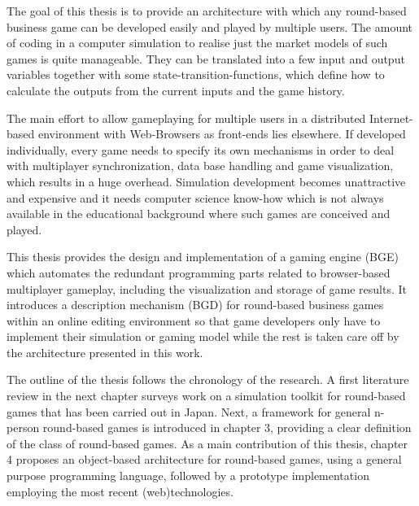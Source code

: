 The goal of this thesis is to provide an architecture with which any round-based business game can be developed easily and played by multiple users. The amount of coding in a computer simulation to realise just the market models of such games is quite manageable. They can be translated into a few input and output variables together with some state-transition-functions, which define how to calculate the outputs from the current inputs and the game history.

The main effort to allow gameplaying for multiple users in a distributed Internet-based environment with Web-Browsers as front-ends lies elsewhere. If developed individually, every game needs to specify its own mechanisms in order to deal with multiplayer synchronization, data base handling and game visualization, which results in a huge overhead. Simulation development becomes unattractive and expensive and it needs computer science know-how which is not always available in the educational background where such games are conceived and played.

This thesis provides the design and implementation of a gaming engine (BGE) which automates the redundant programming parts related to browser-based multiplayer gameplay, including the visualization and storage of game results. It introduces a description mechanism (BGD) for round-based business games within an online editing environment so that game developers only have to implement their simulation or gaming model while the rest is taken care off by the architecture presented in this work.

The outline of the thesis follows the chronology of the research. A first literature review in the next chapter surveys work on a simulation toolkit for round-based games that has been carried out in Japan. Next, a framework for general n-person round-based games is introduced in chapter 3, providing a clear definition of the class of round-based games. As a main contribution of this thesis, chapter 4 proposes an object-based architecture for round-based games, using a general purpose programming language, followed by a prototype implementation employing the most recent (web)technologies.